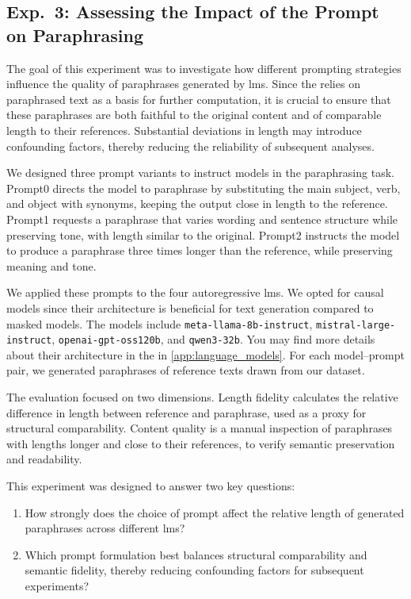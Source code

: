 \subsection{Exp.\ 3: Assessing the Impact of the Prompt on Paraphrasing}
\label{subsec:prompt_impact}

The goal of this experiment was to investigate how different prompting strategies influence the quality of paraphrases generated by \acp{lm}.  
Since the \impAppr{} relies on paraphrased text as a basis for further computation, it is crucial to ensure that these paraphrases are both faithful to the original content and of comparable length to their references.  
Substantial deviations in length may introduce confounding factors, thereby reducing the reliability of subsequent analyses.  

We designed three prompt variants to instruct models in the paraphrasing task.
Prompt0 directs the model to paraphrase by substituting the main subject, verb, and object with synonyms, keeping the output close in length to the reference.  
Prompt1 requests a paraphrase that varies wording and sentence structure while preserving tone, with length similar to the original.  
Prompt2 instructs the model to produce a paraphrase three times longer than the reference, while preserving meaning and tone. 

We applied these prompts to the four autoregressive \acp{lm}. 
We opted for causal models since their architecture is beneficial for text generation compared to masked models.
The models include \texttt{meta-llama-8b-instruct}, \texttt{mistral-large-instruct}, \texttt{openai-gpt-\-oss\-120b}, and \texttt{qwen3-32b}.  
You may find more details about their architecture in the in \autoref{app:language_models}.
For each model–prompt pair, we generated paraphrases of reference texts drawn from our dataset.  


The evaluation focused on two dimensions.
Length fidelity calculates the relative difference in length between reference and paraphrase, used as a proxy for structural comparability.  
Content quality is a manual inspection of paraphrases with lengths longer and close to their references, to verify semantic preservation and readability.  

This experiment was designed to answer two key questions:  
\begin{enumerate}
    \item How strongly does the choice of prompt affect the relative length of generated paraphrases across different \acp{lm}?  
    \item Which prompt formulation best balances structural comparability and semantic fidelity, thereby reducing confounding factors for subsequent \imp{} experiments?  
\end{enumerate}

